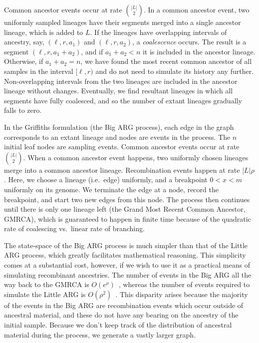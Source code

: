 \documentclass{article}
\begin{document}
Common ancestor events occur at rate $\binom{|L|}{2}$.
In a common ancestor event, two uniformly sampled lineages have their segments
merged into a single ancestor lineage, which is added to $L$.
If the lineages have overlapping intervals of ancestry,
say, $(\ell, r, a_1)$ and $(\ell, r, a_2)$, a
\emph{coalescence} occurs. The result is a segment
$(\ell, r, a_1 + a_2)$, and if $a_1 + a_2 < n$ it is included in the
ancestor lineage. Otherwise, if $a_1 + a_2 = n$, we have found
the most recent common ancestor of all samples in the interval $[\ell, r)$
and do not need to simulate its history any further.
Non-overlapping intervals from the two lineages are included
 in the ancestor lineage without changes. Eventually,
we find resultant lineages in which all segments have fully coalesced,
and so the number of extant lineages gradually falls to zero.

In the Griffiths formulation (the Big ARG process), each edge in the graph corresponds to an extant
lineage and nodes are events in the process. The $n$ initial leaf nodes are
sampling events. Common ancestor events occur at rate $\binom{|L|}{2}$.
When a common ancestor event happens, two uniformly chosen lineages
merge into a common ancestor lineage.
Recombination events happen at rate $|L| \rho$. Here, we choose a lineage (i.e.\ edge) uniformly,
and a breakpoint $0 < x < m$ uniformly on its genome. We terminate the edge at a
node, record the breakpoint, and start two new edges from this node. The process
then continues until there is only one lineage left (the Grand Most Recent
Common Ancestor, GMRCA), which is guaranteed to
happen in finite time because of the quadratic rate of coalescing vs.\ linear rate of branching.

The state-space of the Big ARG process is much simpler than that of the Little ARG process,
which greatly facilitates mathematical reasoning. This simplicity comes at a
substantial cost, however, if we wish to use it as a practical means of
simulating recombinant ancestries.
The number of events in the Big ARG all the way back to the GMRCA
is $O(e^\rho)$~\citep{griffiths1997ancestral}, whereas the number
of events required to simulate the Little ARG is
$O(\rho^2)$~\citep{hein2004gene,baumdicker2021efficient}.
This disparity arises because the majority of the events in the Big ARG are
recombination events which occur outside of ancestral material,
and these do not have any bearing on the ancestry of the initial sample.
Because we don't keep track of the distribution of ancestral material during the process,
we generate a vastly larger graph.
\end{document}
